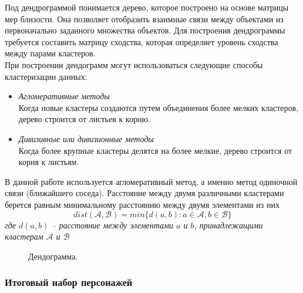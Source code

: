 \documentclass[a4paper,14pt]{extreport} %
\begin{document}
Под дендрограммой понимается дерево, которое построено на основе матрицы мер близости. Она позволяет отобразить взаимные связи между объектами из первоначально заданного множества объектов. Для построения дендрограммы требуется составить матрицу сходства, которая определяет уровень сходства между парами кластеров. \\
При построении дендограмм могут использоваться следующие способы кластеризации данных:
\begin{itemize}
\item {\it Агломеративные методы} \\
Когда новые кластеры создаются путем объединения более мелких кластеров, дерево строится от листьев к корню.
\item {\it Дивизивные или дивизионные методы} \\
Когда более крупные кластеры делятся на более мелкие, дерево строится от корня к листьям.
\end{itemize}
В данной работе используется агломеративный метод, а именно метод одиночной связи (ближайшего соседа).
Расстояние между двумя различными кластерами берется равным минимальному расстоянию между двумя элементами из них
\textit{
\begin{equation}
\label{dendogramm_algo}
 dist(\mathcal{A},\mathcal{B}) = min \{ d(a, b) : a \in \mathcal{A}, b \in \mathcal{B} \}
\end{equation}
где $d(a, b)$ -- расстояние между элементами $a$ и $b$, принадлежащими кластерам $\mathcal{A}$ и $\mathcal{B}$ 
}

\begin{figure}[H]
\caption{Дендограмма.}
\label{dendogramm}
\end{figure}

\subsubsection{Итоговый набор персонажей}
\end{document}
